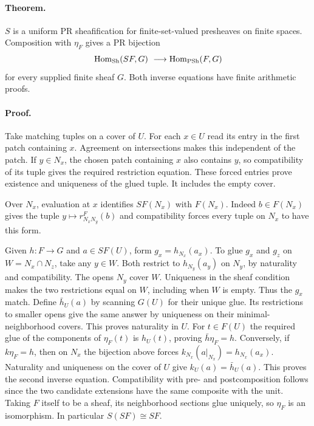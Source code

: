 \paragraph{Theorem.}
$S$ is a uniform PR sheafification for finite-set-valued presheaves on
finite spaces. Composition with $\eta_F$ gives a PR bijection
\[
 \operatorname{Hom}_{\rm Sh}(SF,G)\ \longrightarrow \operatorname{Hom}_{\rm PSh}(F,G)
\]
for every supplied finite sheaf $G$. Both inverse equations have
finite arithmetic proofs.

\paragraph{Proof.}
Take matching tuples on a cover of $U$. For each $x\in U$ read its
entry in the first patch containing $x$. Agreement on intersections
makes this independent of the patch. If $y\in N_x$, the chosen patch
containing $x$ also contains $y$, so compatibility of its tuple gives
the required restriction equation. These forced entries prove
existence and uniqueness of the glued tuple. It includes the empty cover.

Over $N_x$, evaluation at $x$ identifies $SF(N_x)$ with $F(N_x)$.
Indeed $b\in F(N_x)$ gives the tuple $y\mapsto r^F_{N_xN_y}(b)$
and compatibility forces every tuple on $N_x$ to have this form.

Given $h:F\to G$ and $a\in SF(U)$, form $g_x=h_{N_x}(a_x)$.
To glue $g_x$ and $g_z$ on $W=N_x\cap N_z$, take any $y\in W$.
Both restrict to $h_{N_y}(a_y)$ on $N_y$, by naturality and
compatibility. The opens $N_y$ cover $W$. Uniqueness in the sheaf
condition makes the two restrictions equal on $W$, including when
$W$ is empty. Thus the $g_x$ match. Define $\bar h_U(a)$ by scanning
$G(U)$ for their unique glue. Its restrictions to smaller opens
give the same answer by uniqueness on their minimal-neighborhood covers.
This proves naturality in $U$. For $t\in F(U)$ the required glue of the
components of $\eta_F(t)$ is $h_U(t)$, proving $\bar h\eta_F=h$.
Conversely, if $k\eta_F=h$, then on $N_x$ the bijection above forces
$k_{N_x}(a|_{N_x})=h_{N_x}(a_x)$. Naturality and uniqueness on
the cover of $U$ give $k_U(a)=\bar h_U(a)$. This proves the second
inverse equation. Compatibility with pre- and postcomposition follows since
the two candidate extensions have the same composite with the unit.
Taking $F$ itself to be a sheaf, its neighborhood sections glue uniquely,
so $\eta_F$ is an isomorphism. In particular $S(SF)\cong SF$.

